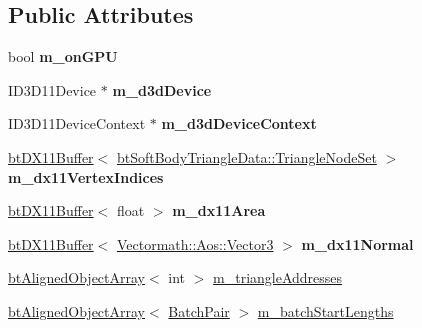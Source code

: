 \subsection*{Public Attributes}
\begin{DoxyCompactItemize}
\item 
\mbox{\label{classbtSoftBodyTriangleDataDX11_a50ba14c102f8c80ec1c048c18131b137}} 
bool {\bfseries m\+\_\+on\+G\+PU}
\item 
\mbox{\label{classbtSoftBodyTriangleDataDX11_a07d14e2987885c0b3a7b9c62b5efdbbd}} 
I\+D3\+D11\+Device $\ast$ {\bfseries m\+\_\+d3d\+Device}
\item 
\mbox{\label{classbtSoftBodyTriangleDataDX11_a11a58764b75d698ec4ae4665b0806244}} 
I\+D3\+D11\+Device\+Context $\ast$ {\bfseries m\+\_\+d3d\+Device\+Context}
\item 
\mbox{\label{classbtSoftBodyTriangleDataDX11_af3dd41c7021a7d56c8d99f2252a04929}} 
\hyperlink{classbtDX11Buffer}{bt\+D\+X11\+Buffer}$<$ \hyperlink{classbtSoftBodyTriangleData_1_1TriangleNodeSet}{bt\+Soft\+Body\+Triangle\+Data\+::\+Triangle\+Node\+Set} $>$ {\bfseries m\+\_\+dx11\+Vertex\+Indices}
\item 
\mbox{\label{classbtSoftBodyTriangleDataDX11_a25334dbbbfb9f6fb7786007d7ee76000}} 
\hyperlink{classbtDX11Buffer}{bt\+D\+X11\+Buffer}$<$ float $>$ {\bfseries m\+\_\+dx11\+Area}
\item 
\mbox{\label{classbtSoftBodyTriangleDataDX11_a19c26ee6fe6529866c371a2731210d74}} 
\hyperlink{classbtDX11Buffer}{bt\+D\+X11\+Buffer}$<$ \hyperlink{classVectormath_1_1Aos_1_1Vector3}{Vectormath\+::\+Aos\+::\+Vector3} $>$ {\bfseries m\+\_\+dx11\+Normal}
\item 
\hyperlink{classbtAlignedObjectArray}{bt\+Aligned\+Object\+Array}$<$ int $>$ \hyperlink{classbtSoftBodyTriangleDataDX11_a265feb3aa3cd4133ae22e94232213420}{m\+\_\+triangle\+Addresses}
\item 
\hyperlink{classbtAlignedObjectArray}{bt\+Aligned\+Object\+Array}$<$ \hyperlink{structbtSoftBodyTriangleDataDX11_1_1BatchPair}{Batch\+Pair} $>$ \hyperlink{classbtSoftBodyTriangleDataDX11_a656296170e5674fd89683db8c5b0948f}{m\+\_\+batch\+Start\+Lengths}
\end{DoxyCompactItemize}
